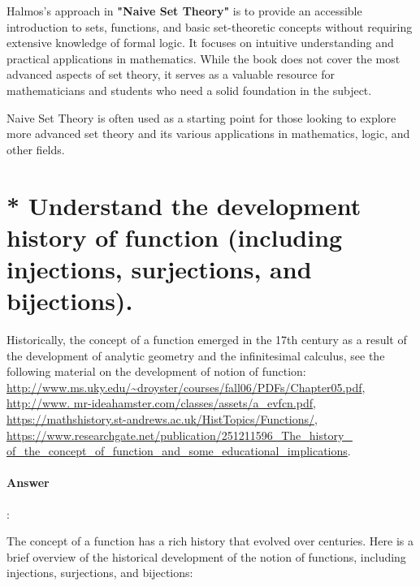 \documentclass{article}
\begin{document}
Halmos's approach in \textbf{"Naive Set Theory"} is to provide an accessible introduction to sets, functions, and basic set-theoretic concepts without requiring extensive knowledge of formal logic. It focuses on intuitive understanding and practical applications in mathematics. While the book does not cover the most advanced aspects of set theory, it serves as a valuable resource for mathematicians and students who need a solid foundation in the subject.

Naive Set Theory is often used as a starting point for those looking to explore more advanced set theory and its various applications in mathematics, logic, and other fields.


\section{* Understand the development history of function (including injections, surjections, and bijections).}

\begin{tcolorbox}
  Historically, the concept of a function emerged in the 17th century as a result of the development of analytic geometry and the infinitesimal calculus, see the following material on the development of notion of function: \url{http://www.ms.uky.edu/~droyster/courses/fall06/PDFs/Chapter05.pdf}, \url{http://www. mr-ideahamster.com/classes/assets/a_evfcn.pdf}, \url{https://mathshistory.st-andrews.ac.uk/HistTopics/Functions/}, \url{https://www.researchgate.net/publication/251211596_The_history_ of_the_concept_of_function_and_some_educational_implications}.
\end{tcolorbox}

\paragraph{Answer}:

The concept of a function has a rich history that evolved over centuries. Here is a brief overview of the historical development of the notion of functions, including injections, surjections, and bijections:
\end{document}
